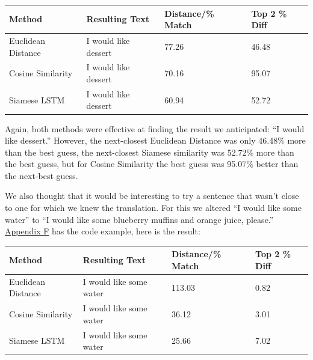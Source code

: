 \documentclass[runningheads]{llncs}
\begin{document}
	\begin{table} 
		\begin{center}
			\begin{tabular}{| l | l | l | l |}
			  \hline			
			  Method & Resulting Text & Distance/\% Match & Top 2 \% Diff \\
			  \hline			
			  Euclidean Distance & I would like dessert & 77.26 & 46.48 \\
			  \hline			
			  Cosine Similarity & I would like dessert & 70.16 & 95.07 \\
			  \hline  
			  Siamese LSTM & I would like dessert & 60.94 & 52.72 \\
			  \hline
			\end{tabular}
		\end{center}
		\label{table:``I Would Love Dessert'' Test}
	\end{table}



	Again, both methods were effective at finding the result we anticipated: ``I would like dessert.'' However, the next-closest Euclidean Distance was only 46.48\% more than the best guess,  the next-closest Siamese similarity was 52.72\% more than the best guess, but for Cosine Similarity the best guess was 95.07\% better than the next-best guess. 

	We also thought that it would be interesting to try a sentence that wasn't close to one for which we knew the translation. For this we altered ``I would like some water'' to ``I would like some blueberry muffins and orange juice, please.''  \hyperlink{Appendix F}{Appendix F} has the code example, here is the result:



	\begin{table} 
		\begin{center}
			\begin{tabular}{| l | l | l | l |}
			  \hline			
			  Method & Resulting Text & Distance/\% Match & Top 2 \% Diff \\
			  \hline			
			  Euclidean Distance & I would like some water & 113.03 & 0.82 \\
			  \hline			
			  Cosine Similarity & I would like some water & 36.12 & 3.01 \\
			  \hline  
			  Siamese LSTM & I would like some water & 25.66 & 7.02 \\
			  \hline
			\end{tabular}
		\end{center}
		\label{table:``I Would Like Some Blueberry Muffins and Orange Juice, Please'' Test}
	\end{table}
\end{document}
